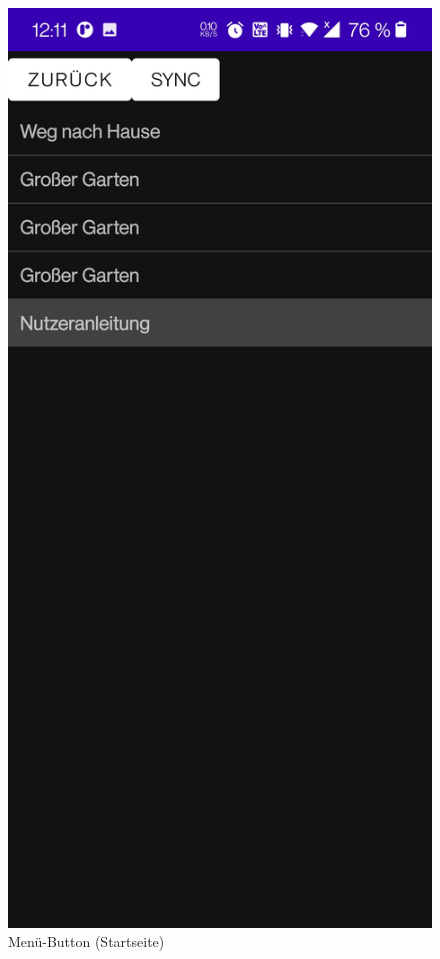 \documentclass{article}
\begin{document}
\begin{figure}[H]
		  \centering
		  \caption{Menü-Button (Startseite)}
		\endminipage\hfill
		  \includegraphics[width=\linewidth]{2_menu2.jpg}

\end{figure}
\end{document}
